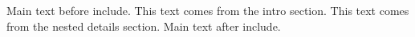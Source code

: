 \documentclass{article}
\begin{document}
Main text before include.
This text comes from the intro section.
This text comes from the nested details section.
Main text after include.
\end{document}
